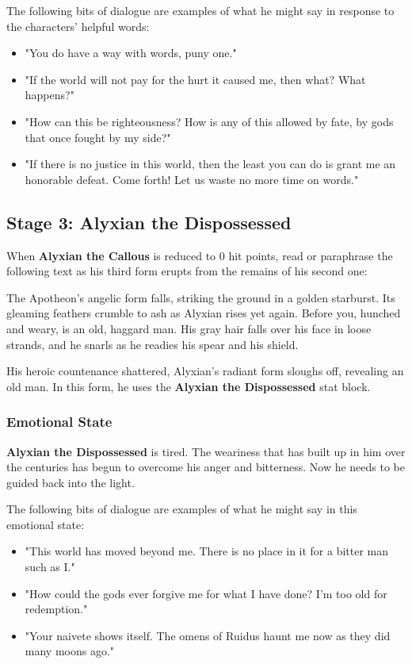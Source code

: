 \documentclass[10pt,a4paper,twoside,bg=print,twocolumn,openany,nodeprecatedcode]{dndbook}
\begin{document}
The following bits of dialogue are examples of what he might say in response to the characters' helpful words:


\begin{itemize}
\item "You do have a way with words, puny one."
\item "If the world will not pay for the hurt it caused me, then what? What happens?"
\item "How can this be righteousness? How is any of this allowed by fate, by gods that once fought by my side?"
\item "If there is no justice in this world, then the least you can do is grant me an honorable defeat. Come forth! Let us waste no more time on words."
\end{itemize}

\subsection{Stage 3: Alyxian the Dispossessed}
When \textbf{Alyxian the Callous} is reduced to 0 hit points, read or paraphrase the following text as his third form erupts from the remains of his second one:

\begin{DndReadAloud}{}
The Apotheon's angelic form falls, striking the ground in a golden starburst. Its gleaming feathers crumble to ash as Alyxian rises yet again. Before you, hunched and weary, is an old, haggard man. His gray hair falls over his face in loose strands, and he snarls as he readies his spear and his shield.

\end{DndReadAloud}

His heroic countenance shattered, Alyxian's radiant form sloughs off, revealing an old man. In this form, he uses the \textbf{Alyxian the Dispossessed} stat block.

\subsubsection{Emotional State}
\textbf{Alyxian the Dispossessed} is tired. The weariness that has built up in him over the centuries has begun to overcome his anger and bitterness. Now he needs to be guided back into the light.

The following bits of dialogue are examples of what he might say in this emotional state:


\begin{itemize}
\item "This world has moved beyond me. There is no place in it for a bitter man such as I."
\item "How could the gods ever forgive me for what I have done? I'm too old for redemption."
\item "Your naivete shows itself. The omens of Ruidus haunt me now as they did many moons ago."
\end{itemize}
\end{document}
